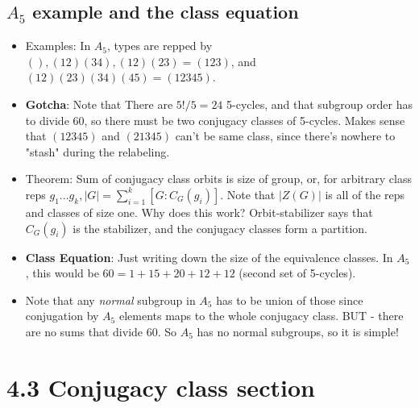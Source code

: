 \documentclass[11pt, oneside]{article}   	%
\begin{document}
\subsection{$A_5$ example and the class equation}
\begin{itemize}

\item Examples: In $A_5$, types are repped by $(), (12)(34), (12)(23) = (123)$, and $ (12)(23)(34)(45) = (12345)$.  
\item \textbf{Gotcha}: Note that There are $5! / 5 = 24$ 5-cycles, and that subgroup order has to divide 60, so there must be two conjugacy classes of 5-cycles.  Makes sense that $(12345)$ and $(21345)$ can't be same class, since there's nowhere to "stash" during the relabeling.
\item Theorem: Sum of conjugacy class orbits is size of group, or, for arbitrary class reps $g_1...g_k, |G| = \sum_{i=1}^k [G:C_G(g_i)]$.  Note that $|Z(G)|$ is all of the reps and classes of size one.  Why does this work?  Orbit-stabilizer says that $C_G(g_i)$ is the stabilizer, and the conjugacy classes form a partition.
\item \textbf{Class Equation}: Just writing down the size of the equivalence classes.  In $A_5$, this would be $60 = 1 + 15 + 20 + 12 + 12$ (second set of 5-cycles).
\item Note that any \emph{normal} subgroup in $A_5$ has to be union of those since conjugation by $A_5$ elements maps to the whole conjugacy class.  BUT - there are no sums that divide 60.  So $A_5$ has no normal subgroups, so it is simple!
\end{itemize}

\section{4.3 Conjugacy class section}
\end{document}
